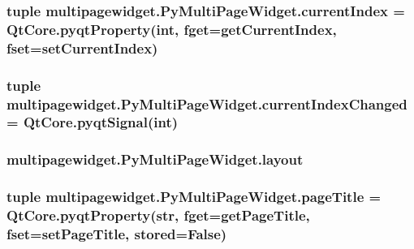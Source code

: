 \subsubsection[{current\+Index}]{\setlength{\rightskip}{0pt plus 5cm}tuple multipagewidget.\+Py\+Multi\+Page\+Widget.\+current\+Index = Qt\+Core.\+pyqt\+Property(int, fget={\bf get\+Current\+Index}, fset={\bf set\+Current\+Index})\hspace{0.3cm}{\ttfamily [static]}}\label{classmultipagewidget_1_1PyMultiPageWidget_ae0b03917c29064d592c3814b2ac361e0}
\hypertarget{classmultipagewidget_1_1PyMultiPageWidget_a5682778ef6c8a66de57aa1b511606118}{}
\subsubsection[{current\+Index\+Changed}]{\setlength{\rightskip}{0pt plus 5cm}tuple multipagewidget.\+Py\+Multi\+Page\+Widget.\+current\+Index\+Changed = Qt\+Core.\+pyqt\+Signal(int)\hspace{0.3cm}{\ttfamily [static]}}\label{classmultipagewidget_1_1PyMultiPageWidget_a5682778ef6c8a66de57aa1b511606118}
\hypertarget{classmultipagewidget_1_1PyMultiPageWidget_a06153c3b9f5097bb7063ea7c56673e2d}{}
\subsubsection[{layout}]{\setlength{\rightskip}{0pt plus 5cm}multipagewidget.\+Py\+Multi\+Page\+Widget.\+layout}\label{classmultipagewidget_1_1PyMultiPageWidget_a06153c3b9f5097bb7063ea7c56673e2d}
\hypertarget{classmultipagewidget_1_1PyMultiPageWidget_a49e3e9dafda5eb5afe9e84977adf7fff}{}
\subsubsection[{page\+Title}]{\setlength{\rightskip}{0pt plus 5cm}tuple multipagewidget.\+Py\+Multi\+Page\+Widget.\+page\+Title = Qt\+Core.\+pyqt\+Property(str, fget={\bf get\+Page\+Title}, fset={\bf set\+Page\+Title}, stored={\bf False})\hspace{0.3cm}{\ttfamily [static]}}\label{classmultipagewidget_1_1PyMultiPageWidget_a49e3e9dafda5eb5afe9e84977adf7fff}
\hypertarget{classmultipagewidget_1_1PyMultiPageWidget_a051f26314dede77f797a8bbfeeaa1814}{}
